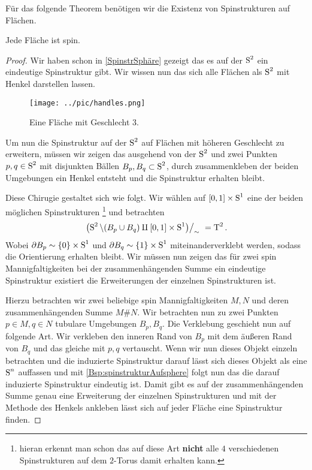 Für das folgende Theorem benötigen wir die Existenz von Spinstrukturen
auf Flächen.
\begin{Satz}\label{existenzspinflächen}
	Jede Fläche ist spin.
	\begin{proof}
		Wir haben schon in \cref{SpinstrSphäre} gezeigt das es 
		auf der $ \S^2 $ ein eindeutige Spinstruktur gibt. Wir
		wissen nun das sich alle Flächen als $ \S^2 $ mit Henkel 
		darstellen lassen.
		

		\begin{figure}[h]
		\begin{center}
			\texttt{[image: ../pic/handles.png]}
			\caption{Eine Fläche mit Geschlecht $ 3 $.}
		\end{center}
		\end{figure}
		
		 Um nun die Spinstruktur auf der $ \S^2 $
		auf Flächen mit höheren Geschlecht zu erweitern, müssen
		wir zeigen das ausgehend von der $ \S^2 $ und zwei Punkten
		$ p,q \in\S^2 $ mit disjunkten Bällen $ B_p,B_q \subset\S^2$,
		durch zusammenkleben der beiden Umgebungen ein Henkel
		entsteht und die Spinstruktur erhalten bleibt.
		
		Diese Chirugie gestaltet sich wie folgt. Wir wählen auf
		$ [0,1] \times \S^1 $ eine der beiden möglichen Spinstrukturen \footnote{hieran erkennt man schon das auf diese Art \textbf{nicht} alle $ 4 $ verschiedenen Spinstrukturen auf dem $ 2 $-Torus damit erhalten kann.} und betrachten 
		\begin{gather*}
		 \left. \left( \S^2 \setminus (B_p \cup B_q) \amalg [0,1]\times \S^1 \right) \right/_{\sim}  ~= \TT^2.
		\end{gather*}
		Wobei $ \partial B_p \sim \{ 0 \}\times \S^1$ und $ \partial B_q \sim \{ 1 \}\times \S^1$ miteinanderverklebt werden, sodass die Orientierung
		erhalten bleibt.
		Wir müssen nun zeigen das für zwei spin Mannigfaltigkeiten bei 
		der zusammenhängenden Summe ein eindeutige Spinstruktur existiert die 
		Erweiterungen der einzelnen Spinstrukturen ist.
	
		Hierzu betrachten wir zwei beliebige spin Mannigfaltigkeiten $ M,N $ und deren
		zusammenhängenden Summe $ M \# N $. Wir betrachten nun zu zwei Punkten
		$ p\in M,q\in N $ tubulare Umgebungen $ B_p,B_q $. Die Verklebung
		geschieht nun auf folgende Art. Wir verkleben den inneren Rand von $ B_p $
		mit	dem äußeren Rand von $ B_q $ und das gleiche mit $ p,q $ vertauscht.
		Wenn wir nun dieses Objekt einzeln betrachten und die induzierte Spinstruktur darauf lässt sich dieses Objekt als eine $ \S^n $ auffassen
		und mit \cref{Bsp:spinstrukturAufsphere} folgt nun das die darauf
		induzierte Spinstruktur eindeutig ist. Damit gibt es auf
		der zusammenhängenden Summe genau eine Erweiterung der
		einzelnen Spinstrukturen und mit der Methode des Henkels
		ankleben lässt sich auf jeder Fläche eine Spinstruktur finden.
	\end{proof}
\end{Satz}

